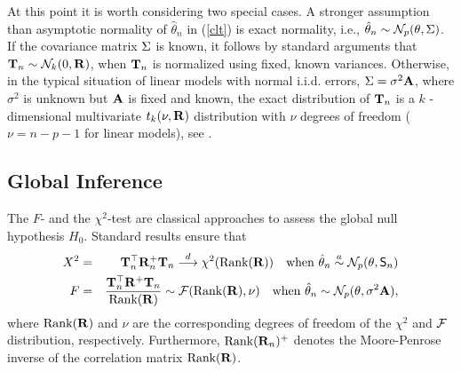 \documentclass[bimj,fleqn]{w-art}
\begin{document}
At this point it is worth considering two special cases. A stronger
assumption than asymptotic normality of $\hat{\theta}_n$ in (\ref{clt})
is exact normality, i.e., $\hat{\theta}_n \sim \mathcal{N}_p(\theta, \Sigma)$. 
If the covariance matrix $\Sigma$ is known, 
it follows by standard arguments that $\mathbf{T}_n \sim \mathcal{N}_k(0, \mathbf{R})$, when $\mathbf{T}_n$ is
normalized using fixed, known variances. Otherwise, 
in the typical situation  of linear models with normal i.i.d.
errors, $\Sigma = \sigma^2 \mathbf{A}$, where $\sigma^2$ is unknown
but $\mathbf{A}$ is fixed and known, 
the exact distribution of $\mathbf{T}_n$ is a $k$%
-dimensional multivariate $t_k(\nu, \mathbf{R})$ distribution with $\nu$ degrees
of freedom ($\nu = n - p - 1$ for linear models), see \citep{Tong1990}.

\subsection{Global Inference}

\label{global} %

The $F$- and the $\chi^2$-test are classical approaches to assess the global
null hypothesis $H_0$. Standard results \citep[such as Theorem
3.5,][]{Serfling1980} ensure that 
\begin{eqnarray*}
X^2 & = & \T_n^\top \Cor_n^+ \T_n
\cL \chi^2(\Rg(\Cor)) \quad \text{when } \hat{\theta}_n \an
\N_p(\theta, \Sraw) \\
F & = & \frac{\T_n^\top \Cor^+ \T_n}{\Rg(\Cor)} \sim \F(\Rg(\Cor), \nu) \quad \text{%
when } \hat{\theta}_n \sim \N_p(\theta, \sigma^2 \A),
\end{eqnarray*}
where $\text{Rank}(\mathbf{R})$ and $\nu$ are the corresponding degrees 
of freedom of the $\chi^2$ and $\mathcal{F}$ distribution, respectively.
Furthermore, $\text{Rank}(\mathbf{R}_n)^+$ denotes the Moore-Penrose inverse of the correlation
matrix $\text{Rank}(\mathbf{R})$.
\end{document}
